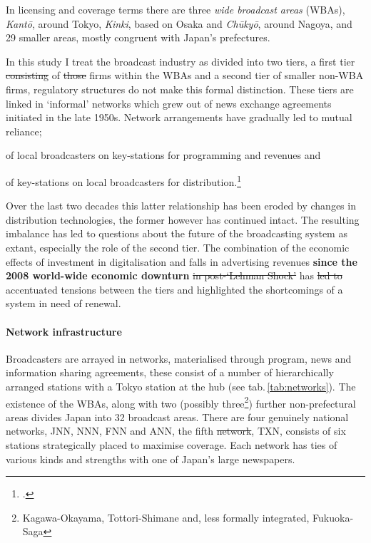 \documentclass[11pt, oneside, a4paper, headsepline]{scrartcl}
\newcommand{\citej}[2] {\footcite[\nopp #1]{#2} }
\newenvironment{close_item}{
\begin{itemize}
 \setlength{\itemsep}{1pt}
 \setlength{\parskip}{1pt}
 \setlength{\parsep}{0pt}}{\end{itemize}
}
\begin{document}
In licensing and coverage terms there are three \emph{wide broadcast areas} (WBAs), \emph{Kant\={o}}, around Tokyo, \emph{Kinki}, based on Osaka and \emph{Ch\={u}ky\={o}}, around Nagoya, and 29 smaller areas, mostly congruent with Japan's prefectures. %

In this study I treat the broadcast industry as divided into two tiers, a first tier \st{consisting} of \st{those} firms within the WBAs and a second tier of smaller non-WBA firms, regulatory structures do not make this formal distinction. These tiers are linked in `informal' networks which grew out of news exchange agreements initiated in the late 1950s. Network arrangements have gradually led to mutual reliance; 

\begin{close_item}
\item of local broadcasters on key-stations for programming and revenues and 
\item of key-stations on local broadcasters for distribution.\citej{140}{Sugaya:2000} 
\end{close_item}

Over the last two decades this latter relationship has been eroded by changes in distribution technologies, the former however has continued intact. The resulting imbalance has led to questions about the future of the broadcasting system as extant, especially the role of the second tier. The combination of the economic effects of investment in digitalisation and falls in advertising revenues {\bf since the 2008 world-wide economic downturn} \st{in post-`Lehman Shock'} has \st{led to} accentuated tensions between the tiers and highlighted the shortcomings of a system in need of renewal.


\paragraph{Network infrastructure} 
Broadcasters are arrayed in networks, materialised through program, news and information sharing agreements, these consist of a number of hierarchically arranged stations with a Tokyo station at the hub (see tab.\,\ref{tab:networks}). The existence of the WBAs, along with two (possibly three\footnote{Kagawa-Okayama, Tottori-Shimane and, less formally integrated, Fukuoka-Saga}) further non-prefectural areas divides Japan into 32 broadcast areas. There are four genuinely national networks, JNN, NNN, FNN and ANN, the fifth \st{network}, TXN, consists of six stations strategically placed to maximise coverage. Each network has ties of various kinds and strengths with one of Japan's large newspapers. 
\end{document}
